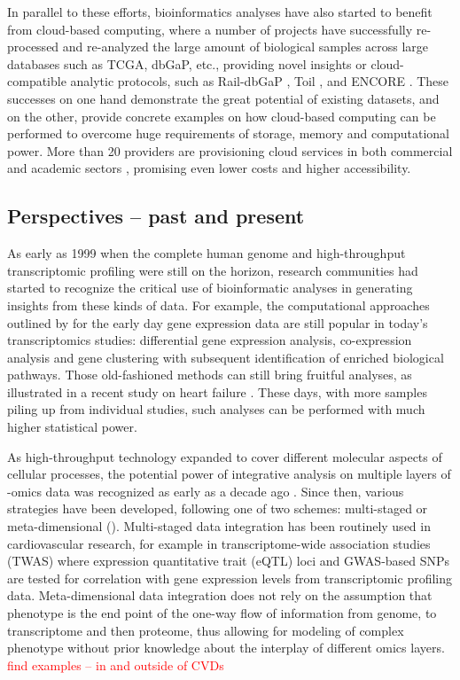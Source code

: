 \documentclass[letter]{bioinfo}
\newcommand{\comment}[1]{\textcolor{red}{#1}}
\begin{document}
	In parallel to these efforts, bioinformatics analyses have also started to benefit from cloud-based computing, where a number of projects have successfully re-processed and re-analyzed the large amount of biological samples across large databases such as TCGA, dbGaP, etc., providing novel insights or cloud-compatible analytic protocols, such as Rail-dbGaP \citep{Nellore:2016:RaildbGaP}, Toil \citep{Vivian:2017:Toil}, and ENCORE \citep{UMich:2018:Encore}. These successes on one hand demonstrate the great potential of existing datasets, and on the other, provide concrete examples on how cloud-based computing can be performed to overcome huge requirements of storage, memory and computational power. More than 20 providers are provisioning cloud services in both commercial and academic sectors \citep{Langmead:2018:Cloud}, promising even lower costs and higher accessibility.
	
	
	
	\subsection*{Perspectives -- past and present}
	
	As early as 1999 when the complete human genome and high-throughput transcriptomic profiling were still on the horizon, research communities had started to recognize the critical use of bioinformatic analyses in generating insights from these kinds of data. For example, the computational approaches outlined by \cite{Claverie:1999:Computational} for the early day gene expression data are still popular in today's transcriptomics studies: differential gene expression analysis, co-expression analysis and gene clustering with subsequent identification of enriched biological pathways. Those old-fashioned methods can still bring fruitful analyses, as illustrated in a recent study on heart failure \citep{Santolini:2018:personalized}. These days, with more samples piling up from individual studies, such analyses can be performed with much higher statistical power.
	
	As high-throughput technology expanded to cover different molecular aspects of cellular processes, the potential power of integrative analysis on multiple layers of -omics data was recognized as early as a decade ago \citep{Hawkins:2010:Nextgeneration}. Since then, various strategies have been developed, following one of two schemes: multi-staged or meta-dimensional (\cite{Ritchie:2015:Methods}). Multi-staged data integration has been routinely used in cardiovascular research, for example in transcriptome-wide association studies (TWAS) where expression quantitative trait (eQTL) loci and GWAS-based SNPs are tested for correlation with gene expression levels from transcriptomic profiling data. Meta-dimensional data integration does not rely on the assumption that phenotype is the end point of the one-way flow of information from genome, to transcriptome and then proteome, thus allowing for modeling of complex phenotype without prior knowledge about the interplay of different omics layers.
	\comment{find examples -- in and outside of CVDs}
	
\end{document}
